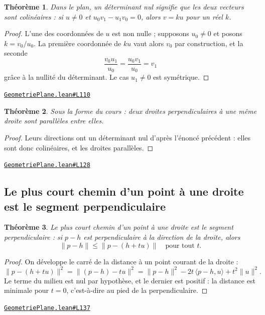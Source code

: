 \documentclass[11pt,a4paper]{article}
\theoremstyle{definition}
\theoremstyle{plain}
\newtheorem{theoreme}{Théorème}
\newcommand{\source}[2]{\par\smallskip\noindent\hfill{\footnotesize\href{#1}{\texttt{#2}}}\par\smallskip}
\begin{document}
\begin{theoreme}
Dans le plan, un déterminant nul signifie que les deux vecteurs sont colinéaires : si
$u \ne 0$ et $u_0 v_1 - u_1 v_0 = 0$, alors $v = ku$ pour un réel $k$.
\end{theoreme}

\begin{proof}
L'une des coordonnées de $u$ est non nulle ; supposons $u_0 \ne 0$ et posons
$k = v_0/u_0$. La première coordonnée de $ku$ vaut alors $v_0$ par construction, et la
seconde
\[ \frac{v_0 u_1}{u_0} = \frac{u_0 v_1}{u_0} = v_1 \]
grâce à la nullité du déterminant. Le cas $u_1 \ne 0$ est symétrique.
\end{proof}
\source{https://github.com/Commutator-IO/learn-lean/blob/main/cours/01-college/02-geometrie-plane/GeometriePlane.lean\#L110}{GeometriePlane.lean\#L110}

\begin{theoreme}
Sous la forme du cours : deux droites perpendiculaires à une même droite sont
parallèles entre elles.
\end{theoreme}

\begin{proof}
Leurs directions ont un déterminant nul d'après l'énoncé précédent : elles sont donc
colinéaires, et les droites parallèles.
\end{proof}
\source{https://github.com/Commutator-IO/learn-lean/blob/main/cours/01-college/02-geometrie-plane/GeometriePlane.lean\#L128}{GeometriePlane.lean\#L128}

\subsection{Le plus court chemin d'un point à une droite est le segment perpendiculaire}

\begin{theoreme}
Le plus court chemin d'un point à une droite est le segment perpendiculaire : si
$p - h$ est perpendiculaire à la direction de la droite, alors
\[ \|p - h\| \le \|p - (h + tu)\| \quad \text{pour tout } t . \]
\end{theoreme}

\begin{proof}
On développe le carré de la distance à un point courant de la droite :
\[ \|p - (h + tu)\|^2 = \|(p - h) - tu\|^2
   = \|p - h\|^2 - 2t\,\langle p - h, u\rangle + t^2\|u\|^2 . \]
Le terme du milieu est nul par hypothèse, et le dernier est positif : la distance est
minimale pour $t = 0$, c'est-à-dire au pied de la perpendiculaire.
\end{proof}
\source{https://github.com/Commutator-IO/learn-lean/blob/main/cours/01-college/02-geometrie-plane/GeometriePlane.lean\#L137}{GeometriePlane.lean\#L137}
\end{document}
